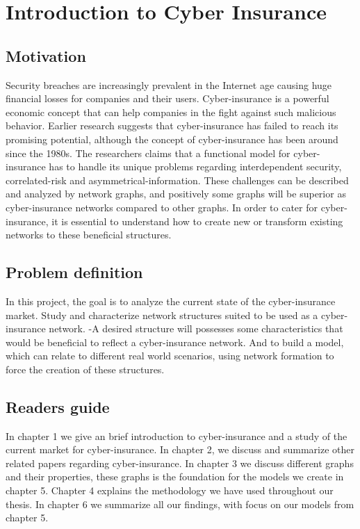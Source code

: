 \chapter{Introduction to Cyber Insurance}
\label{chp:introductionToCyberInsurance} 

\section{Motivation}
Security breaches are increasingly prevalent in the Internet age causing huge financial losses
for companies and their users. Cyber-insurance is a powerful economic concept that can help
companies in the fight against such malicious behavior. Earlier research suggests that cyber-insurance has failed to reach its promising potential, although the concept of cyber-insurance has
been around since the 1980s. The researchers claims that a functional model for cyber-insurance has to handle its unique problems regarding interdependent security, correlated-risk and asymmetrical-information. These challenges can be described and analyzed by network graphs, and positively some graphs will be superior as cyber-insurance networks compared to other graphs. In order to cater for cyber-insurance, it is essential to understand how to create new or transform existing networks to these beneficial structures. 

\section{Problem definition}

In this project, the goal is to analyze the current state of the cyber-insurance market. Study and characterize network structures suited to be used as a cyber-insurance network. -A desired structure will possesses some characteristics that would be beneficial to reflect a cyber-insurance network. And to build a model, which can relate to different real world scenarios, using network formation to force the creation of these structures. 
\section{Readers guide}
In chapter 1 we give an brief introduction to cyber-insurance and a study of the current market for cyber-insurance. In chapter 2, we discuss and summarize other related papers regarding cyber-insurance. In chapter 3 we discuss different graphs and their properties, these graphs is the foundation for the models we create in chapter 5. Chapter 4 explains the methodology we have used throughout our thesis. In chapter 6 we summarize all our findings, with focus on our models from chapter 5. 

